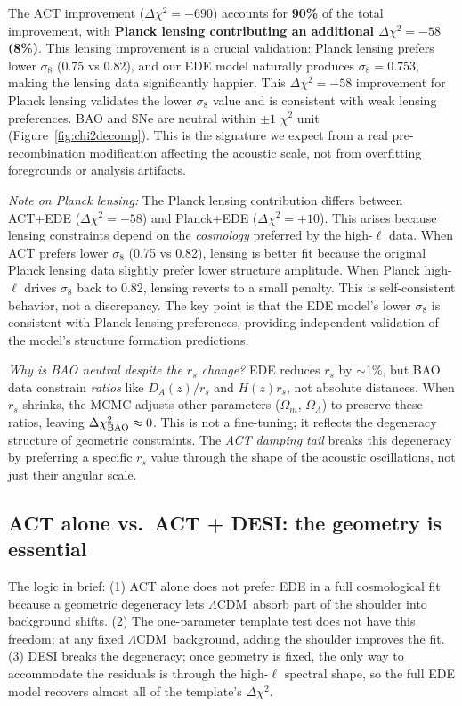 \documentclass[twocolumn,showpacs,preprintnumbers,amsmath,amssymb,prd]{revtex4-2}
\newcommand{\lcdm}{$\Lambda$CDM}
\begin{document}
The ACT improvement ($\Delta\chi^2 = -690$) accounts for \textbf{90\%} of the 
total improvement, with \textbf{Planck lensing contributing an additional 
$\Delta\chi^2 = -58$ (8\%)}. This lensing improvement is a crucial validation: 
Planck lensing prefers lower $\sigma_8$ (0.75 vs 0.82), and our EDE model 
naturally produces $\sigma_8 = 0.753$, making the lensing data significantly 
happier. This $\Delta\chi^2 = -58$ improvement for Planck lensing validates 
the lower $\sigma_8$ value and is consistent with weak lensing preferences. 
BAO and SNe are neutral within $\pm 1$ $\chi^2$ unit (Figure~\ref{fig:chi2decomp}). 
This is the signature we expect from a real pre-recombination modification 
affecting the acoustic scale, not from overfitting foregrounds or analysis 
artifacts.

\emph{Note on Planck lensing:} The Planck lensing contribution differs between 
ACT+EDE ($\Delta\chi^2 = -58$) and Planck+EDE ($\Delta\chi^2 = +10$). This arises 
because lensing constraints depend on the \emph{cosmology} preferred by the 
high-$\ell$ data. When ACT prefers lower $\sigma_8$ (0.75 vs 0.82), lensing is 
better fit because the original Planck lensing data slightly prefer lower 
structure amplitude. When Planck high-$\ell$ drives $\sigma_8$ back to 0.82, 
lensing reverts to a small penalty. This is self-consistent behavior, not 
a discrepancy. The key point is that the EDE model's lower $\sigma_8$ is 
consistent with Planck lensing preferences, providing independent validation 
of the model's structure formation predictions.

\emph{Why is BAO neutral despite the $r_s$ change?} EDE reduces $r_s$ by 
$\sim$1\%, but BAO data constrain \emph{ratios} like $D_A(z)/r_s$ and 
$H(z) r_s$, not absolute distances. When $r_s$ shrinks, the MCMC adjusts 
other parameters ($\Omega_m$, $\Omega_\Lambda$) to preserve these ratios, 
leaving $\Delta\chi^2_{\rm BAO} \approx 0$. This is not a fine-tuning; it 
reflects the degeneracy structure of geometric constraints. The \emph{ACT 
damping tail} breaks this degeneracy by preferring a specific $r_s$ value 
through the shape of the acoustic oscillations, not just their angular scale.

\subsection{ACT alone vs.\ ACT + DESI: the geometry is essential}
\label{sec:act_vs_desi}

The logic in brief: (1) ACT alone does not prefer EDE in a full cosmological 
fit because a geometric degeneracy lets \lcdm\ absorb part of the shoulder 
into background shifts. (2) The one-parameter template test does not have 
this freedom; at any fixed \lcdm\ background, adding the shoulder improves 
the fit. (3) DESI breaks the degeneracy; once geometry is fixed, the only 
way to accommodate the residuals is through the high-$\ell$ spectral shape, 
so the full EDE model recovers almost all of the template's $\Delta\chi^2$.
\end{document}
